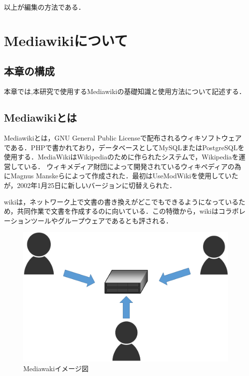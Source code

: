 以上が編集の方法である．\cite{rensyuu}

\chapter{Mediawikiについて}
\section{本章の構成}
本章では,本研究で使用するMediawikiの基礎知識と使用方法について記述する．
\section{Mediawikiとは}
Mediawikiとは，GNU General Public Licenseで配布されるウィキソフトウェアである．PHPで書かれており，データベースとしてMySQLまたはPostgreSQLを使用する．MediaWikiはWikipediaのために作られたシステムで，Wikipediaを運営している．
ウィキメディア財団によって開発されているウィキペディアの為にMagnus Manskeらによって作成された．最初はUseModWikiを使用していたが，2002年1月25日に新しいバージョンに切替えられた． \cite{media}

wikiは，ネットワーク上で文書の書き換えがどこでもできるようになっているため，共同作業で文書を作成するのに向いている．この特徴から，wikiはコラボレーションツールやグループウェアであるとも評される．\cite{media}

\begin{figure}[htb]
\centering
\includegraphics[width=15cm]{mediawiki}
\caption{Mediawakiイメージ図}\label{図}
\end{figure}

